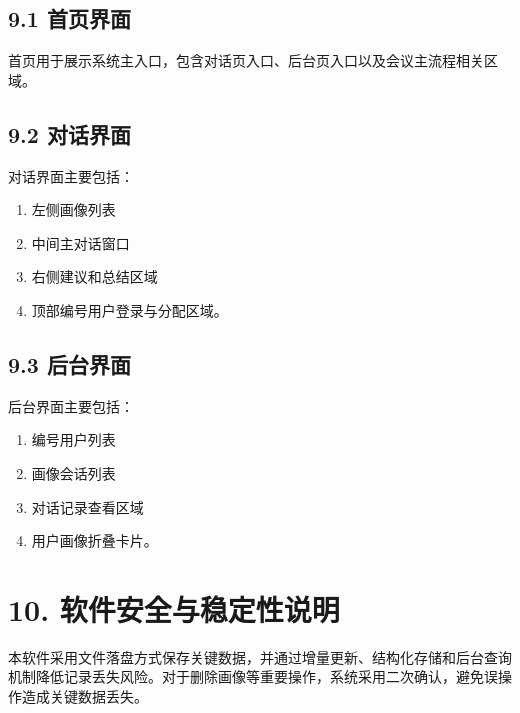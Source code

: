\documentclass[12pt,a4paper]{article}
\begin{document}
\subsection*{9.1 首页界面}
\vspace{0.45em}
首页用于展示系统主入口，包含对话页入口、后台页入口以及会议主流程相关区域。\par
\vspace{0.45em}
\subsection*{9.2 对话界面}
\vspace{0.45em}
对话界面主要包括：\par
\vspace{0.45em}
\begin{enumerate}
\item 左侧画像列表
\item 中间主对话窗口
\item 右侧建议和总结区域
\item 顶部编号用户登录与分配区域。
\end{enumerate}
\vspace{0.45em}
\subsection*{9.3 后台界面}
\vspace{0.45em}
后台界面主要包括：\par
\vspace{0.45em}
\begin{enumerate}
\item 编号用户列表
\item 画像会话列表
\item 对话记录查看区域
\item 用户画像折叠卡片。
\end{enumerate}
\vspace{0.45em}
\section*{10. 软件安全与稳定性说明}
\vspace{0.45em}
本软件采用文件落盘方式保存关键数据，并通过增量更新、结构化存储和后台查询机制降低记录丢失风险。对于删除画像等重要操作，系统采用二次确认，避免误操作造成关键数据丢失。\par
\vspace{0.45em}
\end{document}
